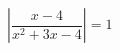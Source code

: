 \begin{ex}[type=equation]
	\begin{condition}
		$\left | \dfrac{x - 4}{x^2 + 3x - 4}\right| = 1$
	\end{condition}
\end{ex}